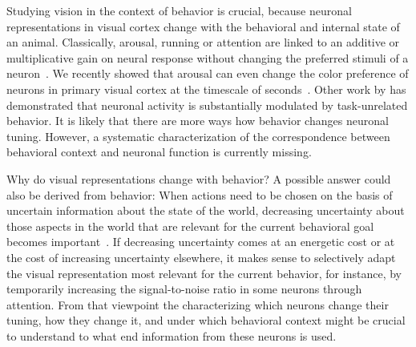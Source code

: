 \documentclass[COG,11pt]{ercgrant}
\begin{document}
Studying vision in the context of behavior is crucial, because neuronal representations in visual cortex change with the behavioral and internal state of an animal. 
Classically, arousal, running or attention are linked to an additive or multiplicative gain on neural response without changing the preferred stimuli of a neuron~\parencite{Dadarlat2017-jw, Mineault2016-fk}.
We recently showed that arousal can even change the color preference of neurons in primary visual cortex at the timescale of seconds~\parencite{Franke2022-do}. 
Other work by \textcite{Musall2019-kd} has demonstrated that neuronal activity is substantially modulated by task-unrelated behavior.
It is likely that there are more ways how behavior changes neuronal tuning. 
However, a systematic characterization of the correspondence between behavioral context and neuronal function is currently missing. 

Why do visual representations change with behavior? 
A possible answer could also be derived from behavior:
When actions need to be chosen on the basis of uncertain information about the state of the world, decreasing uncertainty about those aspects in the world that are relevant for the current behavioral goal becomes important~\parencite{Chebolu2022-tb}. 
If decreasing uncertainty comes at an energetic cost or at the cost of increasing uncertainty elsewhere, it makes sense to selectively adapt the visual representation most relevant for the current behavior, for instance, by temporarily increasing the signal-to-noise ratio in some neurons through attention.
From that viewpoint the characterizing which neurons change their tuning, how they change it, and under which behavioral context might be crucial to understand to what end information from these neurons is used.
\end{document}
